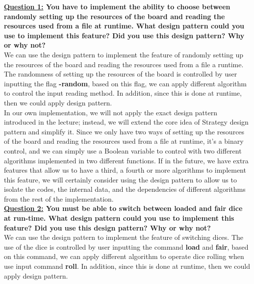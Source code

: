 \documentclass[10pt]{article}
\begin{document}
\pagebreak
\textbf{\underline{Question 1:} You have to implement the ability to choose between randomly setting up the resources of the board and reading the resources used from a file at runtime. What design pattern could you use to implement this feature? Did you use this design pattern? Why or why not?}\\

We can use the \Strategy design pattern to implement the feature of randomly setting up the resources of the board and reading the resources used from a file a runtime. The randomness of setting up the resources of the board is controlled by user inputting the flag \textbf{-random}, based on this flag, we can apply different algorithm to control the input reading method. In addition, since this is done at runtime, then we could apply \Strategy design pattern.\\

In our own implementation, we will not apply the exact \Strategy design pattern introduced in the lecture; instead, we will extend the core idea of Strategy design pattern and simplify it. Since we only have two ways of setting up the resources of the board and reading the resources used from a file at runtime, it's a binary control, and we can simply use a Boolean variable to control with two different algorithms implemented in two different functions. If in the future, we have extra features that allow us to have a third, a fourth or more algorithms to implement this feature, we will certainly consider using the \Strategy design pattern to allow us to isolate the codes, the internal data, and the dependencies of different algorithms from the rest of the implementation.\\

\textbf{\underline{Question 2:} You must be able to switch between loaded and fair dice at run-time. What design pattern could you use to implement this feature? Did you use this design pattern? Why or why not?}\\

We can use the \Strategy design pattern to implement the feature of switching dices. The use of the dice is controlled by user inputting the command \textbf{load} and \textbf{fair}, based on this command, we can apply different algorithm to operate dice rolling when use input command \textbf{roll}. In addition, since this is done at runtime, then we could apply \Strategy design pattern.
\end{document}
